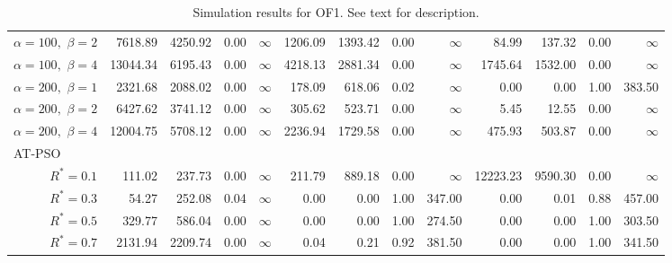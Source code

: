 \documentclass[cmbright]{staauth}
\begin{document}
\begin{table}[ht]
{\begin{tabular}{r|rrrr|rrrr|rrrr}
  $\alpha = 100,$ $\beta =2$ & 7618.89 & 4250.92 & 0.00 & $\infty$ & 1206.09 & 1393.42 & 0.00 & $\infty$ & 84.99 & 137.32 & 0.00 & $\infty$ \\
  $\alpha = 100,$ $\beta =4$ & 13044.34 & 6195.43 & 0.00 & $\infty$ & 4218.13 & 2881.34 & 0.00 & $\infty$ & 1745.64 & 1532.00 & 0.00 & $\infty$ \\
  $\alpha = 200,$ $\beta =1$ & 2321.68 & 2088.02 & 0.00 & $\infty$ & 178.09 & 618.06 & 0.02 & $\infty$ & 0.00 & 0.00 & 1.00 & 383.50 \\
  $\alpha = 200,$ $\beta =2$ & 6427.62 & 3741.12 & 0.00 & $\infty$ & 305.62 & 523.71 & 0.00 & $\infty$ & 5.45 & 12.55 & 0.00 & $\infty$ \\
  $\alpha = 200,$ $\beta =4$ & 12004.75 & 5708.12 & 0.00 & $\infty$ & 2236.94 & 1729.58 & 0.00 & $\infty$ & 475.93 & 503.87 & 0.00 & $\infty$ \\
\hline
\multicolumn{1}{l|}{AT-PSO} &&&&&&&&&&&&\\
  $R^* = 0.1$ & 111.02 & 237.73 & 0.00 & $\infty$ & 211.79 & 889.18 & 0.00 & $\infty$ & 12223.23 & 9590.30 & 0.00 & $\infty$ \\
  $R^* = 0.3$ & 54.27 & 252.08 & 0.04 & $\infty$ & 0.00 & 0.00 & 1.00 & 347.00 & 0.00 & 0.01 & 0.88 & 457.00 \\
  $R^* = 0.5$ & 329.77 & 586.04 & 0.00 & $\infty$ & 0.00 & 0.00 & 1.00 & 274.50 & 0.00 & 0.00 & 1.00 & 303.50 \\
  $R^* = 0.7$ & 2131.94 & 2209.74 & 0.00 & $\infty$ & 0.04 & 0.21 & 0.92 & 381.50 & 0.00 & 0.00 & 1.00 & 341.50 \\
   \hline
\end{tabular}
}
\caption{Simulation results for OF1. See text for description.}
\label{tab:psosim1}
\end{table}
\end{document}
